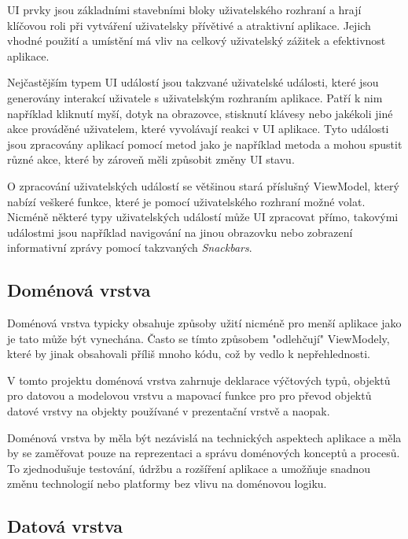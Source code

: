 UI prvky jsou základními stavebními bloky uživatelského rozhraní a hrají klíčovou roli při vytváření uživatelsky přívětivé a atraktivní aplikace. 
Jejich vhodné použití a umístění má vliv na celkový uživatelský zážitek a efektivnost aplikace.

Nejčastějším typem UI událostí jsou takzvané uživatelské události, které jsou generovány interakcí uživatele s uživatelským rozhraním aplikace. 
Patří k nim například kliknutí myší, dotyk na obrazovce, stisknutí klávesy nebo jakékoli jiné akce prováděné uživatelem, které vyvolávají reakci v 
UI aplikace. Tyto události jsou zpracovány aplikací pomocí metod jako je například metoda  a mohou spustit různé akce, které by zároveň
měli způsobit změny UI stavu.

O zpracování uživatelských událostí se většinou stará příslušný ViewModel, který nabízí veškeré funkce, které je pomocí uživatelského rozhraní možné volat.
Nicméně některé typy uživatelských událostí může UI zpracovat přímo, takovými událostmi jsou například navigování na jinou obrazovku nebo zobrazení 
informativní zprávy pomocí takzvaných \textit{Snackbars}.

\subsection*{Doménová vrstva}
Doménová vrstva typicky obsahuje způsoby užití nicméně pro menší aplikace jako je tato může být vynechána. Často se tímto způsobem "odlehčují" ViewModely,
které by jinak obsahovali příliš mnoho kódu, což by vedlo k nepřehlednosti.

V tomto projektu doménová vrstva zahrnuje deklarace výčtových typů, objektů pro datovou a modelovou vrstvu a mapovací funkce pro pro převod
objektů datové vrstvy na objekty používané v prezentační vrstvě a naopak.

Doménová vrstva by měla být nezávislá na technických aspektech aplikace a měla by se zaměřovat pouze na reprezentaci a správu doménových
 konceptů a procesů. To zjednodušuje testování, údržbu a rozšíření aplikace a umožňuje snadnou změnu technologií nebo platformy bez 
 vlivu na doménovou logiku.

\subsection*{Datová vrstva}


